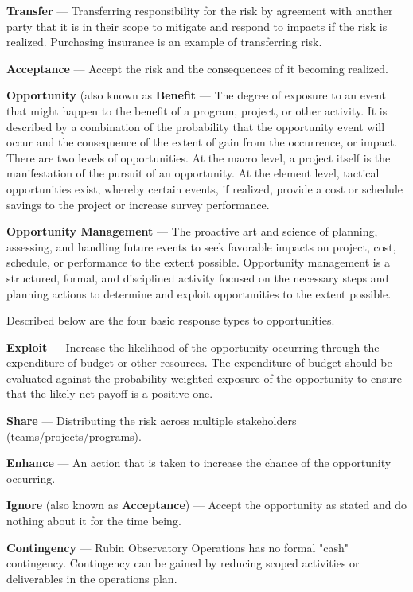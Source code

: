 \textbf{Transfer} ---
Transferring responsibility for the risk by agreement with another party that it is in their scope to mitigate and respond to impacts if the risk is realized. Purchasing insurance is an example of transferring risk.

\textbf{Acceptance} ---
Accept the risk and the consequences of it becoming realized.


\textbf{Opportunity} (also known as \textbf{Benefit} ---
The degree of exposure to an event that might happen to the benefit of a program, project, or other activity.
It is described by a combination of the probability that the opportunity event will occur and the consequence of the extent of gain from the occurrence, or impact.
There are two levels of opportunities. At the macro level, a project itself is the manifestation of the pursuit of an opportunity.
At the element level, tactical opportunities exist, whereby certain events, if realized, provide a cost or schedule savings to the project or increase survey performance.

\textbf{Opportunity Management} ---
The proactive art and science of planning, assessing, and handling future events to seek favorable impacts on project, cost, schedule, or performance to the extent possible.
Opportunity management is a structured, formal, and disciplined activity focused on the necessary steps and planning actions to determine and exploit opportunities to the extent possible.

Described below are the four basic response types to opportunities.

\textbf{Exploit} ---
Increase the likelihood of the opportunity occurring through the expenditure of budget or other resources.
The expenditure of budget should be evaluated against the probability weighted exposure of the opportunity to ensure that the likely net payoff is a positive one.

\textbf{Share} ---
Distributing the risk across multiple stakeholders (teams/projects/programs).

\textbf{Enhance} ---
An action that is taken to increase the chance of the opportunity occurring.

\textbf{Ignore} (also known as \textbf{Acceptance}) ---
Accept the opportunity as stated and do nothing about it for the time being.

\textbf{Contingency} ---
Rubin Observatory Operations has no formal "cash" contingency.
Contingency can be gained by reducing scoped activities or deliverables in the operations plan.

